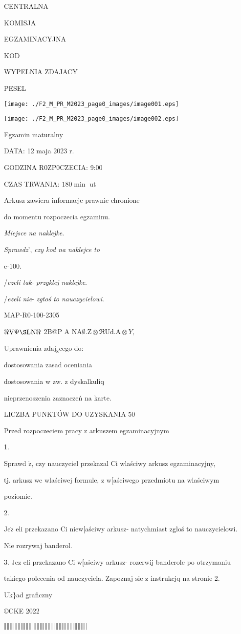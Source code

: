\documentclass[a4paper,12pt]{article}
\begin{document}
CENTRALNA

KOMISJA

EGZAMINACYJNA

KOD

WYPELNIA ZDAJACY

PESEL
\begin{center}
\texttt{[image: ./F2\_M\_PR\_M2023\_page0\_images/image001.eps]}

\texttt{[image: ./F2\_M\_PR\_M2023\_page0\_images/image002.eps]}
\end{center}
Egzamin maturalny

DATA: 12 maja 2023 r.

GODZINA R0ZP0CZECIA: 9:00

CZAS TRWANIA: $180 \displaystyle \min$ ut

Arkusz zawiera informacje prawnie chronione

do momentu rozpoczecia egzaminu.

{\it Miejsce na naklejke}.

{\it Sprawdz}', {\it czy kod na naklejce to}

e-100.

/{\it ezeli tak}- {\it przyklej naklejke}.

/{\it ezeli nie}- {\it zgtoś to nauczycielowi}.

MAP-R0-100-2305

$\Re \mathrm{V}\Psi\S \mathrm{L}\mathrm{N}\Re$ 2B@P A $\mathrm{N}\mathrm{A}\emptyset.\mathrm{Z}\otimes\Re \mathrm{U}\mathrm{d}.\mathrm{A}\otimes Y,$

Uprawnienia $\mathrm{z}\mathrm{d}\mathrm{a}\mathrm{j}_{8}$cego do:

\fbox{} dostosowania zasad oceniania

\fbox{} dostosowania w zw. z dyskalkuliq

\fbox{} nieprzenoszenia zaznaczeń na karte.

LICZBA PUNKTÓW DO UZYSKANIA 50

Przed rozpoczeciem pracy z arkuszem egzaminacyjnym

1.

Sprawd $\acute{\mathrm{z}}$, czy nauczyciel przekazal Ci wlaściwy arkusz egzaminacyjny,

tj. arkusz we wlaściwej formule, z w[aściwego przedmiotu na wlaściwym

poziomie.

2.

$\mathrm{J}\mathrm{e}\dot{\mathrm{z}}$ eli przekazano Ci niew[aściwy arkusz- natychmiast zgloś to nauczycielowi.

Nie rozrywaj banderol.

3. $\mathrm{J}\mathrm{e}\dot{\mathrm{z}}$ eli przekazano Ci w[aściwy arkusz- rozerwij banderole po otrzymaniu

takiego polecenia od nauczyciela. Zapoznaj $\mathrm{s}\mathrm{i}\mathrm{e}$ z instrukcjq na stronie 2.

Uk\}ad graficzny

\copyright CKE 2022

$\Vert\Vert\Vert\Vert\Vert\Vert\Vert\Vert\Vert\Vert\Vert\Vert\Vert\Vert\Vert\Vert\Vert\Vert\Vert\Vert\Vert\Vert\Vert\Vert\Vert\Vert\Vert\Vert\Vert\Vert|$
\end{document}
